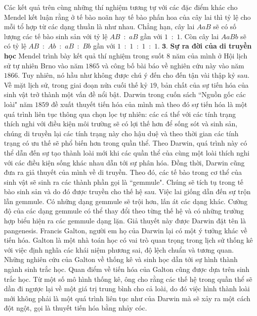 \begin{multicols}{2}
	\vskip 0.1cm
	Các kết quả trên cùng những thí nghiệm tương tự với các đặc điểm khác cho Mendel kết luận rằng ở tế bào noãn hay tế bào phấn hoa của cây lai thì tỷ lệ cho mỗi tổ hợp từ các dạng thuần là như nhau. Chẳng hạn, cây lai $AaB$ sẽ có số lượng các tế bào sinh sản với tỷ lệ $AB$~:~$aB$ gần với $1$~:~$1$. Còn cây lai $AaBb$ sẽ có tỷ lệ $AB$~:~$Ab$~:~$aB$~:~$Bb$ gần với $1$~:~$1$~:~$1$~:~$1$.
	\vskip 0.1cm
	$\pmb{3.}$ \textbf{\color{timhieukhoahoc}Sự ra đời của di truyền học}
	\vskip 0.1cm
	Mendel trình bày kết quả thí nghiệm trong suốt $8$ năm của mình ở Hội lịch sử tự nhiên Brno vào năm $1865$ và công bố bài báo về nghiên cứu này vào năm $1866$. Tuy nhiên, nó hầu như không được chú ý đến cho đến tận vài thập kỷ sau.
	\vskip 0.1cm
	Về mặt lịch sử, trong giai đoạn nửa cuối thế kỷ $19$, bản chất của sự tiến hóa của sinh vật trở thành một vấn đề nổi bật. Darwin trong cuốn sách ``Nguồn gốc các loài" năm $1859$ đề xuất thuyết tiến hóa của mình mà theo đó sự tiến hóa là một quá trình liên tục thông qua chọn lọc tự nhiên: các cá thể với các tính trạng thích nghi với điều kiện môi trường sẽ có lợi thế hơn để sống sót và sinh sản, chúng di truyền lại các tính trạng này cho hậu duệ và theo thời gian các tính trạng có ưu thế sẽ phổ biến hơn trong quần thể. Theo Darwin, quá trình này có thể dẫn đến sự tạo thành loài mới khi các quần thể của cùng một loài thích nghi với các điều kiện sống khác nhau dẫn tới sự phân hóa.
	\vskip 0.1cm
	Đồng thời, Darwin cũng đưa ra giả thuyết của mình về di truyền. Theo đó, các tế bào trong cơ thể của sinh vật sẽ sinh ra các thành phần gọi là ``gemmule". Chúng sẽ tích tụ trong tế bào sinh sản và do đó được truyền cho thế hệ sau. Việc lai giống dẫn đến sự trộn lẫn gemmule. Có những dạng gemmule sẽ trội hơn, lấn át các dạng khác. Cường độ của các dạng gemmule có thể thay đổi theo từng thế hệ và có những trường hợp biểu hiện ra các gemmule dạng lặn. Giả thuyết này được Darwin đặt tên là pangenesis.
	\vskip 0.1cm
	Francis Galton, người em họ của Darwin lại có một ý tưởng khác về tiến hóa. Galton là một nhà toán học có vai trò quan trọng trong lịch sử thống kê với việc định nghĩa các khái niệm phương sai, độ lệch chuẩn và tương quan. Những nghiên cứu của Galton về thống kê và sinh học dẫn tới sự hình thành ngành sinh trắc học. Quan điểm về tiến hóa của Galton cũng được dựa trên  sinh trắc học. Từ một số mô hình thống kê, ông cho rằng các thế hệ trong quần thể sẽ dần đi ngược lại về một giá trị trung bình cho cả loài, do đó việc hình thành loài mới không phải là một quá trình liên tục như của Darwin mà sẽ xảy ra một cách đột ngột, gọi là thuyết tiến hóa bằng nhảy cóc.

\end{multicols}
